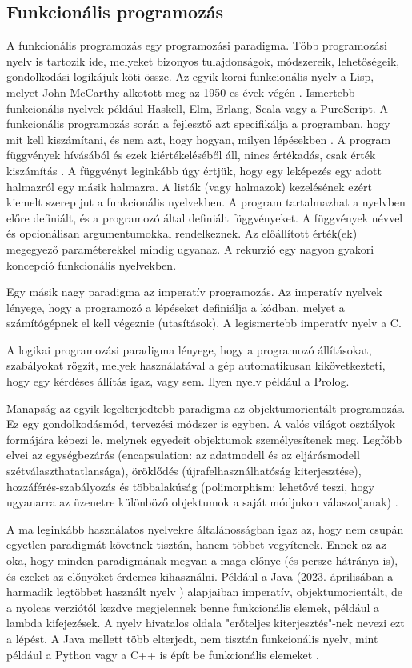 \documentclass[12pt]{article}
\begin{document}
\subsection{Funkcionális programozás}
A funkcionális programozás egy programozási paradigma. Több programozási nyelv is tartozik ide, melyeket bizonyos tulajdonságok, módszereik, lehetőségeik, gondolkodási logikájuk köti össze. Az egyik korai funkcionális nyelv a Lisp, melyet John McCarthy alkotott meg az 1950-es évek végén \cite{JM}. Ismertebb funkcionális nyelvek például Haskell, Elm, Erlang, Scala vagy a PureScript. 
A funkcionális programozás során a fejlesztő azt specifikálja a programban, hogy mit kell kiszámítani, és nem azt, hogy hogyan, milyen lépésekben \cite{VD}. A program függvények hívásából és ezek kiértékeléséből áll, nincs értékadás, csak érték kiszámítás \cite{VD}. A függvényt leginkább úgy értjük, hogy egy leképezés egy adott halmazról egy másik halmazra\cite{sy}. A listák (vagy halmazok) kezelésének ezért kiemelt szerep jut a funkcionális nyelvekben. A program tartalmazhat a nyelvben előre definiált, és a programozó által definiált függvényeket. A függvények névvel és opcionálisan argumentumokkal rendelkeznek. Az előállított érték(ek) megegyező paraméterekkel mindig ugyanaz. A rekurzió egy nagyon gyakori koncepció funkcionális nyelvekben.

Egy másik nagy paradigma az imperatív programozás. Az imperatív nyelvek lényege, hogy a programozó a lépéseket definiálja a kódban, melyet a számítógépnek el kell végeznie (utasítások). A legismertebb imperatív nyelv a C.

A logikai programozási paradigma lényege, hogy a programozó állításokat, szabályokat rögzít, melyek használatával a gép automatikusan kikövetkezteti, hogy egy kérdéses állítás igaz, vagy sem. Ilyen nyelv például a Prolog.

Manapság az egyik legelterjedtebb paradigma az objektumorientált programozás. Ez egy gondolkodásmód, tervezési módszer is egyben. A valós világot osztályok formájára képezi le, melynek egyedeit objektumok személyesítenek meg. Legfőbb elvei az egységbezárás (encapsulation: az adatmodell és az eljárásmodell szétválaszthatatlansága), öröklődés (újrafelhasználhatóság kiterjesztése), hozzáférés-szabályozás és többalakúság (polimorphism: lehetővé teszi, hogy ugyanarra az üzenetre különböző objektumok a saját módjukon válaszoljanak) \cite{VD}.

A ma leginkább használatos nyelvekre általánosságban igaz az, hogy nem csupán egyetlen paradigmát követnek tisztán, hanem többet vegyítenek. Ennek az az oka, hogy minden paradigmának megvan a maga előnye (és persze hátránya is), és ezeket az előnyöket érdemes kihasználni. Például a Java (2023. áprilisában a harmadik legtöbbet használt nyelv \cite{TIO}) alapjaiban imperatív, objektumorientált, de a nyolcas verziótól kezdve \cite{Java} megjelennek benne funkcionális elemek, például a lambda kifejezések. A nyelv hivatalos oldala \cite{Java} "erőteljes kiterjesztés"-nek nevezi ezt a lépést.
A Java mellett több elterjedt, nem tisztán funkcionális nyelv, mint például a Python vagy a C++ is épít be funkcionális elemeket \cite{py} \cite{cpp}.
\end{document}
